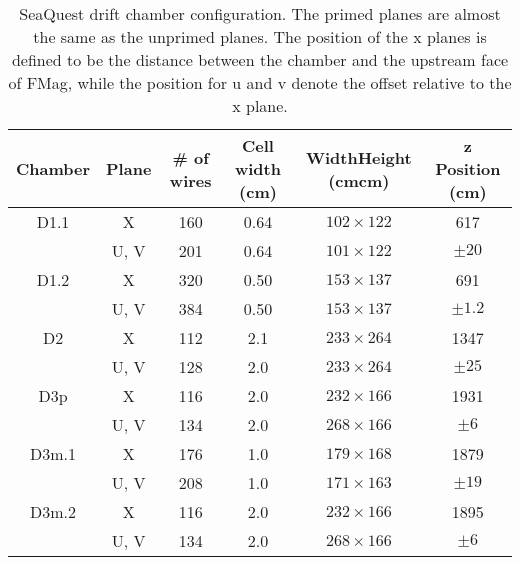 \documentclass[../main.tex]{subfiles}
\begin{document}
\begin{table}[h!]
	\caption{SeaQuest drift chamber configuration. The primed planes are almost the same as the unprimed
		planes. The position of the x planes is defined to be the distance between the chamber and the
		upstream face of FMag, while the position for u and v denote the offset relative to the x plane.}
	\label{table:chamber}
	\begin{tabular}{cccccc}
		\hline
		Chamber & Plane & \# of wires & Cell width (\unit{\cm}) & Width\texttimes Height (\unit{\cm}\texttimes\unit{\cm}) & z Position (\unit{cm}) \\ \hline
		D1.1    & X     & \num{160}   & \num{0.64}              & $102\times 122$                                         & \num{617}              \\
		        & U, V  & \num{201}   & \num{0.64}              & $101\times 122$                                         & $\pm20$                \\
		D1.2    & X     & \num{320}   & \num{0.50}              & $153\times 137$                                         & \num{691}              \\
		        & U, V  & \num{384}   & \num{0.50}              & $153\times 137$                                         & $\pm1.2$               \\
		D2      & X     & \num{112}   & \num{2.1}               & $233\times264$                                          & \num{1347}             \\
		        & U, V  & \num{128}   & \num{2.0}               & $233\times264$                                          & $\pm25$                \\
		D3p     & X     & \num{116}   & \num{2.0}               & $232\times166$                                          & \num{1931}             \\
		        & U, V  & \num{134}   & \num{2.0}               & $268\times166$                                          & $\pm6$                 \\
		D3m.1   & X     & \num{176}   & \num{1.0}               & $179\times168$                                          & \num{1879}             \\
		        & U, V  & \num{208}   & \num{1.0}               & $171\times163$                                          & $\pm19$                \\
		D3m.2   & X     & \num{116}   & \num{2.0}               & $232\times166$                                          & \num{1895}             \\
		        & U, V  & \num{134}   & \num{2.0}               & $268\times166$                                          & $\pm6$
	\end{tabular}
\end{table}
\end{document}
